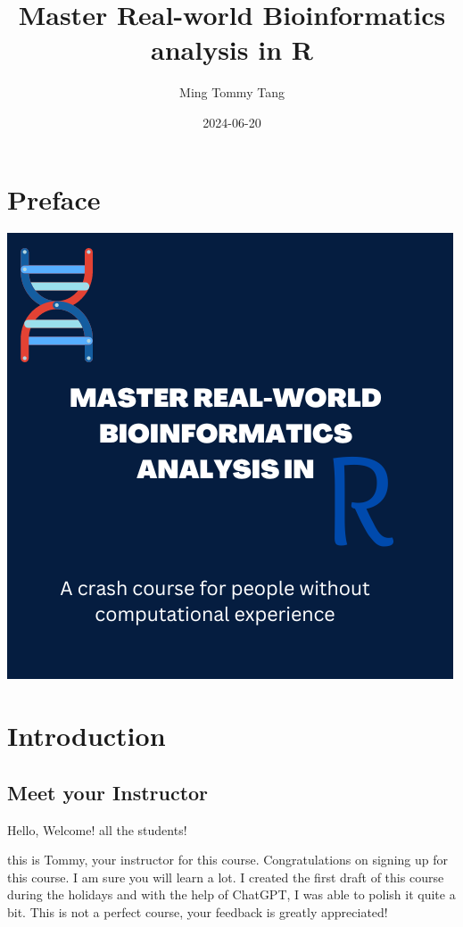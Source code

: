 \documentclass[
]{book}
\title{Master Real-world Bioinformatics analysis in R}
\author{Ming Tommy Tang}
\date{2024-06-20}
\begin{document}
\maketitle

{
\setcounter{tocdepth}{1}
\tableofcontents
}
\hypertarget{preface}{%
\chapter{Preface}\label{preface}}

\includegraphics{images/bookcover.png}

\hypertarget{intro}{%
\chapter{Introduction}\label{intro}}

\hypertarget{meet-your-instructor}{%
\section{Meet your Instructor}\label{meet-your-instructor}}

Hello, Welcome! all the students!

this is Tommy, your instructor for this course. Congratulations on signing up for this course. I am sure you will learn a lot. I created the first draft of this course during the holidays and with the help of ChatGPT, I was able to polish it quite a bit. This is not a perfect course, your feedback is greatly appreciated!
\end{document}
